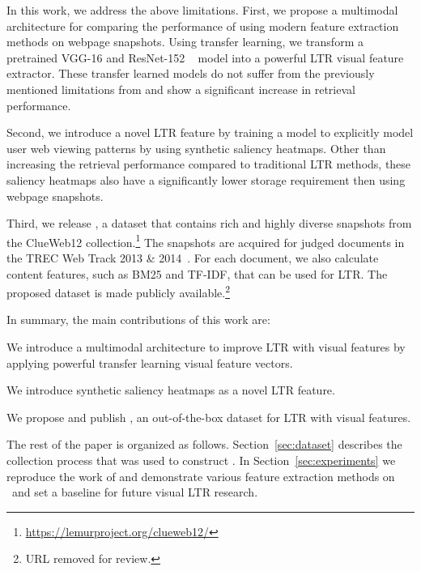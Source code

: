 In this work, we address the above limitations.
First, we propose a multimodal architecture for comparing the performance of using modern feature extraction methods on webpage snapshots. Using transfer learning, we transform a pretrained VGG-16 and ResNet-152 ~\cite{simonyan2014very, he2016deep} model into a powerful \ac{LTR} visual feature extractor. These transfer learned models do not suffer from the previously mentioned limitations from \cite{fan2017learning} and show a significant increase in retrieval performance.

Second, we introduce a novel \ac{LTR} feature by training a model to explicitly model user web viewing patterns by using synthetic saliency heatmaps. Other than increasing the retrieval performance compared to traditional \ac{LTR} methods, these saliency heatmaps also have a significantly lower storage requirement then using webpage snapshots.

Third, we release \datasetname, a dataset that contains rich and highly diverse snapshots from the ClueWeb12 collection.\footnote{\url{https://lemurproject.org/clueweb12/}} The snapshots are acquired for judged documents in the TREC Web Track 2013 \& 2014~\cite{collins2013trec,collins2015trec}. For each document, we also calculate content features, such as BM25 and TF-IDF, that can be used for \ac{LTR}.
The proposed dataset is made publicly available.\footnote{URL removed for review.}
%


In summary, the main contributions of this work are:
\begin{inparaenum}[(i)]
\item We introduce a multimodal architecture to improve \ac{LTR} with visual features by applying powerful transfer learning visual feature vectors.
\item We introduce synthetic saliency heatmaps as a novel \ac{LTR} feature. 
\item We propose and publish \datasetname, an out-of-the-box dataset for \ac{LTR} with visual features.
\end{inparaenum}

 The rest of the paper is organized as follows. Section~\ref{sec:dataset} describes the collection process that was used to construct \datasetname. In Section~\ref{sec:experiments} we reproduce the work of \citet{fan2017learning} and demonstrate various feature extraction methods on \datasetname~and set a baseline for future visual \ac{LTR} research.  
\fi